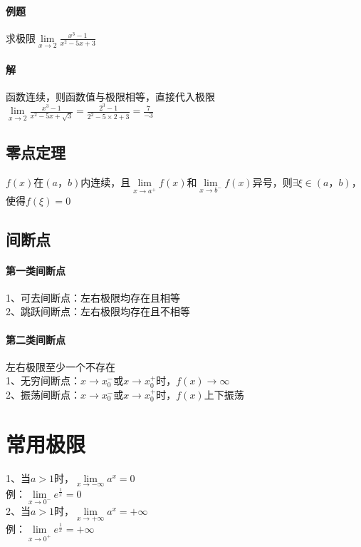 \documentclass{article}
\begin{document}
\begin{flushleft}
	\paragraph{例题}
	求极限$\lim\limits_{x\to 2}\frac{x^3-1}{x^2-5x+3}$
	\paragraph{解}
	函数连续，则函数值与极限相等，直接代入极限\\
	$\lim\limits_{x\to 2}\frac{x^3-1}{x^2-5x+\sqrt3}=\frac{2^3-1}{2^2-5\times2+3}=\frac{7}{-3}$\\
	
	\subsection{零点定理}
	$f(x)$在$(a，b)$内连续，且$\lim\limits_{x\to a^+} f(x)$和$\lim\limits_{x\to b^-} f(x)$异号，则$\exists \xi \in (a，b)$，使得$f(\xi)=0$\\
	
	\subsection{间断点}
	
	\paragraph{第一类间断点}
	1、可去间断点：左右极限均存在且相等\\
	2、跳跃间断点：左右极限均存在且不相等\\
	\paragraph{第二类间断点}
	左右极限至少一个不存在\\
	1、无穷间断点：$x\to x_0^-$或$x\to x_0^+$时，$f(x)\to \infty$\\
	2、振荡间断点：$x\to x_0^-$或$x\to x_0^+$时，$f(x)$上下振荡\\
	
	\section{常用极限}
	
	1、当$a>1$时，$\lim\limits_{x\to-\infty}a^x=0$\\
	\qquad 例：$\lim\limits_{x\to 0^-}e^{\frac{1}{x}}=0$\\
	2、当$a>1$时，$\lim\limits_{x\to+\infty}a^x=+\infty$\\
	\qquad 例：$\lim\limits_{x\to 0^+}e^{\frac{1}{x}}=+\infty$
	

\end{flushleft}
\end{document}
